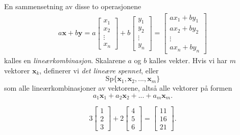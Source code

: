 En sammensetning av disse to operasjonene
\begin{align*}
a\mathbf{x}+b\mathbf{y}=
a
\begin{bmatrix}
x_1  \\
x_2 \\
\vdots \\
x_n
\end{bmatrix}
+
b
\begin{bmatrix}
y_1  \\
y_2 \\
\vdots \\
y_n
\end{bmatrix}
=
\begin{bmatrix}
ax_1 + by_1  \\
ax_2 + by_2\\
\vdots \\
ax_n + by_n
\end{bmatrix}
\end{align*}
kalles en \emph{lineærkombinasjon}. Skalarene $a$ og $b$ kalles vekter. Hvis vi har $m$ vektorer $\mathbf{x}_k$, definerer vi \emph{det lineære spennet}, eller
\begin{equation*}
\text{Sp}\{\mathbf{x}_1,\mathbf{x}_2,...,\mathbf{x}_m\}
\end{equation*}
som alle lineærkombinasjoner av vektorene, altså alle vektorer på formen
\begin{equation*}
a_1\mathbf{x}_1+a_2\mathbf{x}_2+...+a_m\mathbf{x}_m.
\end{equation*}
\begin{ex}
	\begin{equation*}
	3\begin{bmatrix}1 \\  2 \\ 3 \end{bmatrix}+ 2\begin{bmatrix}4 \\  5 \\ 6 \end{bmatrix}=\begin{bmatrix}11 \\  16 \\ 21 \end{bmatrix}.
	\end{equation*}
\end{ex}
